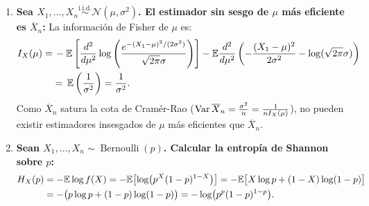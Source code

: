 \begin{enumerate}
  \smallskip\noindent\textcolor{azulresalt}{\textbf{Interpretación:} Incorrecto, Wikipedia: La información de Fisher mide la cantidad de información que una sola observación de Bernoulli proporciona sobre el parámetro desconocido $p$. Una información de Fisher alta significa que los datos observados son muy sensibles a cambios en $p$. \\    
    Puntos de máxima información (ocurren cuando $p \to 0$ o $p \to 1$): Interpretación: un solo resultado inesperado nos da muchísima información para ajustar nuestra creencia sobre el valor real de $p$. Hay poca incertidumbre sobre el resultado esperado, por lo que una desviación es muy informativa.\\    
    Punto de mínima información (cuando $p = 0{,}5$): una sola observación es la menos informativa posible.}
    
    Correcto es (JVR) información de Fisher mide la bondad de la conjetura sobre el parámetro a partir de una única observación: Si el valor real de $\theta$ es cercano a $\theta_0 \coloneqq \arg\max I(\theta)$--- y si además $I(\theta)$ es grande--- entonces el estimador construido con la única observación que tenemos sobre el parámetro $T(x_1)$ estará cercana al valor real de $\theta$.
  \item \textbf{Sea $X_1, \dots, X_n \stackrel{\text{i.i.d.}}{\sim} \mathcal{N}(\mu, \sigma^2)$. El estimador sin sesgo de $\mu$ más eficiente es $\overline{X}_n$:}
  La información de Fisher de $\mu$ es:
  \begin{align*}
    I_X(\mu) = & \,  -\mathbb{E}\left[\frac{d^2}{d\mu^2}\log\left(\frac{e^{-(X_1-\mu)^2/(2\sigma^2)}}{\sqrt{2\pi}\sigma}\right)\right] -\mathbb{E}\frac{d^2}{d\mu^2}\left(-\frac{(X_1-\mu)^2}{2\sigma^2} - \log(\sqrt{2\pi}\sigma)\right)  \\ & =\,   \mathbb{E}\left(\frac{1}{\sigma^2}\right) = \frac{1}{\sigma^2}.  
  \end{align*}
  Como $\overline{X}_n$ satura la cota de Cramér-Rao ($\operatorname{Var}\overline{X}_n = \frac{\sigma^2}{n} = \frac{1}{n I_X(\mu)}$), no pueden existir estimadores insesgados de $\mu$ más eficientes que $\overline{X}_n$.

  \item \textbf{Sean $X_1, \dots, X_n \sim \operatorname{Bernoulli}(p)$. Calcular la entropía de Shannon sobre $p$:}
  \begin{align*}      
    H_X(p) & = -\mathbb{E}\log f(X) = -\mathbb{E}\bigl[\log\bigl(p^X(1-p)^{1-X}\bigr)\bigr] = -\mathbb{E}\bigl[X\log p + (1-X)\log(1-p)\bigr] \\ & = -\bigl(p\log p + (1-p)\log(1-p)\bigr) = -\log\bigl(p^p(1-p)^{1-p}\bigr).
  \end{align*}
\end{enumerate}
